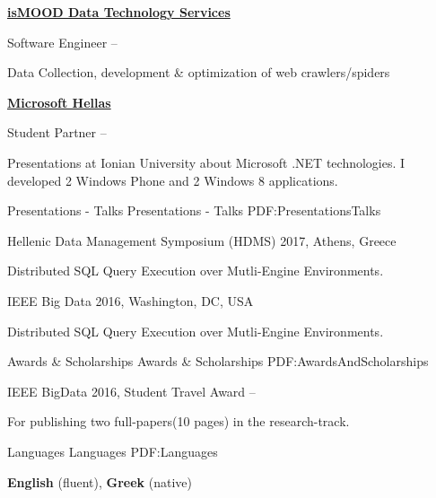\documentclass[letterpaper,MMMyyyy,nonstopmode]{simpleresumecv}
\begin{document}
\begin{Body}
\Entry
\href{http://ismood.gr}
{\textbf{isMOOD Data Technology Services}}

\Gap
\BulletItem
Software Engineer
\hfill
{} --
\begin{Detail}
	\SubBulletItem
	Data Collection, development \& optimization of web crawlers/spiders
\end{Detail}

\Entry
\href{http://microsoft.gr}
{\textbf{Microsoft Hellas}}

\Gap
\BulletItem
Student Partner
\hfill
{} --
\begin{Detail}
	\SubBulletItem
	Presentations at Ionian University about Microsoft .NET technologies.
	\SubBulletItem
	I developed 2 Windows Phone and 2 Windows 8 applications.
	 
\end{Detail}



\Section
{Presentations - Talks}
{Presentations - Talks}
{PDF:PresentationsTalks}

\BulletItem
Hellenic Data Management Symposium (HDMS) 2017, Athens, Greece
\hfill
{}
\begin{Detail}
	\Item
	Distributed SQL Query Execution over Mutli-Engine Environments.
\end{Detail}
\BulletItem
IEEE Big Data 2016, Washington, DC, USA
\hfill
{}
\begin{Detail}
	\Item
	Distributed SQL Query Execution over Mutli-Engine Environments.
\end{Detail}


\Section
{Awards \&\newline
Scholarships}
{Awards \& Scholarships}
{PDF:AwardsAndScholarships}

\BulletItem
IEEE BigData 2016, Student Travel Award
\hfill
{} --
\begin{Detail}
\Item
For publishing two full-papers(10 pages) in the research-track.
\end{Detail}



\Section
{Languages}
{Languages}
{PDF:Languages}

\BulletItem
\textbf{English} (fluent), \textbf{Greek} (native)


\end{Body}
\end{document}
